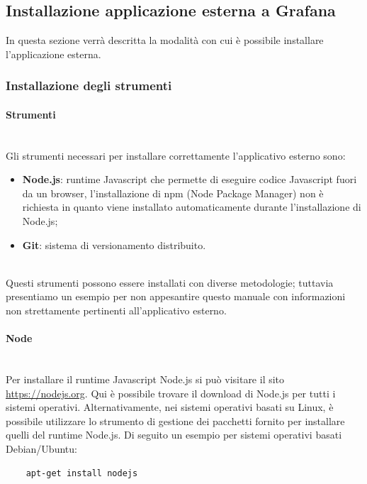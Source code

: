 \subsection{Installazione applicazione esterna a Grafana}
In questa sezione verrà descritta la modalità con cui è possibile installare l'applicazione esterna.

\subsubsection{Installazione degli strumenti}
\paragraph{Strumenti}\mbox{}\\ [1mm]
Gli strumenti necessari per installare correttamente l'applicativo esterno sono:
\begin{itemize}
    \item \textbf{Node.js}: runtime Javascript che permette di eseguire codice Javascript fuori da un browser, l'installazione di npm (Node Package Manager) non è richiesta in quanto viene installato automaticamente durante l'installazione di Node.js;
    \item \textbf{Git}: sistema di versionamento distribuito.
\end{itemize}
\mbox{}\\ [1mm]
Questi strumenti possono essere installati con diverse metodologie; tuttavia presentiamo un esempio per non appesantire questo manuale con informazioni non strettamente pertinenti all'applicativo esterno.

\paragraph{Node}\mbox{}\\ [1mm]
Per installare il runtime Javascript Node.js si può visitare il sito \url{https://nodejs.org}. Qui è possibile trovare il download di Node.js per tutti i sistemi operativi. Alternativamente, nei sistemi operativi basati su Linux, è possibile utilizzare lo strumento di gestione dei pacchetti fornito per installare quelli del runtime Node.js. Di seguito un esempio per sistemi operativi basati Debian/Ubuntu: \\
\begin{verbatim}
    apt-get install nodejs
\end{verbatim}

